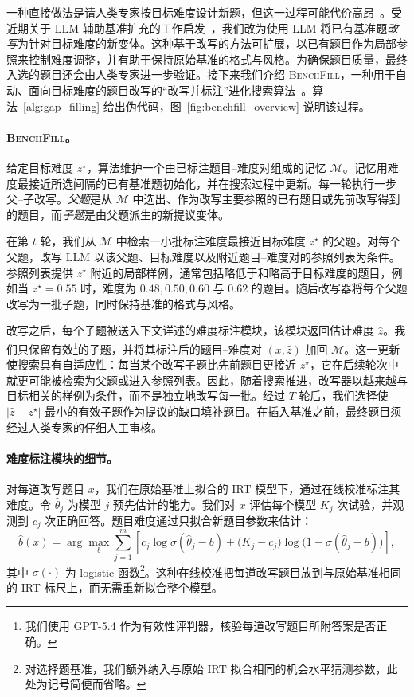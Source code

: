 一种直接做法是请人类专家按目标难度设计新题，但这一过程可能代价高昂~\cite{rein2024,phan2025humanity}。受近期关于 LLM 辅助基准扩充的工作启发~\cite{cheng2026vera,li2025ride,ying2024automating,xia2024top}，我们改为使用 LLM 将已有基准题\textit{改写}为针对目标难度的新变体。这种基于改写的方法可扩展，以已有题目作为局部参照来控制难度调整，并有助于保持原始基准的格式与风格。为确保题目质量，最终入选的题目还会由人类专家进一步验证。接下来我们介绍 \textsc{BenchFill}，一种用于自动、面向目标难度的题目改写的“改写并标注”进化搜索算法~\citep{sharma5openevolve,liu2026evox}。算法~\ref{alg:gap_filling} 给出伪代码，图~\ref{fig:benchfill_overview} 说明该过程。

\paragraph{\textsc{BenchFill}。}
给定目标难度 $z^\star$，算法维护一个由已标注题目--难度对组成的记忆 $\mathcal{M}$。记忆用难度最接近所选间隔的已有基准题初始化，并在搜索过程中更新。每一轮执行一步父--子改写。\emph{父题}是从 $\mathcal{M}$ 中选出、作为改写主要参照的已有题目或先前改写得到的题目，而\emph{子题}是由父题派生的新提议变体。


在第 $t$ 轮，我们从 $\mathcal{M}$ 中检索一小批标注难度最接近目标难度 $z^\star$ 的父题。对每个父题，改写 LLM 以该父题、目标难度以及附近题目--难度对的参照列表为条件。参照列表提供 $z^\star$ 附近的局部样例，通常包括略低于和略高于目标难度的题目，例如当 $z^\star=0.55$ 时，难度为 $0.48,0.50,0.60$ 与 $0.62$ 的题目。随后改写器将每个父题改写为一批子题，同时保持基准的格式与风格。


改写之后，每个子题被送入下文详述的难度标注模块，该模块返回估计难度 $\hat{z}$。我们只保留有效\footnote{我们使用 GPT-5.4 作为有效性评判器，核验每道改写题目所附答案是否正确。}的子题，并将其标注后的题目--难度对 $(x,\hat{z})$ 加回 $\mathcal{M}$。这一更新使搜索具有自适应性：每当某个改写子题比先前题目更接近 $z^\star$，它在后续轮次中就更可能被检索为父题或进入参照列表。因此，随着搜索推进，改写器以越来越与目标相关的样例为条件，而不是独立地改写每一批。经过 $T$ 轮后，我们选择使 $|\hat{z}-z^\star|$ 最小的有效子题作为提议的缺口填补题目。在插入基准之前，最终题目须经过人类专家的仔细人工审核。

\paragraph{难度标注模块的细节。}
对每道改写题目 $x$，我们在原始基准上拟合的 IRT 模型下，通过在线校准标注其难度。令 $\hat{\theta}_j$ 为模型 $j$ 预先估计的能力。我们对 $x$ 评估每个模型 $K_j$ 次试验，并观测到 $c_j$ 次正确回答。题目难度通过只拟合新题目参数来估计：
\[
\hat{b}(x)
=
\arg\max_b
\sum_{j=1}^{m}
\left[
c_j\log \sigma(\hat{\theta}_j-b)
+
\bigl(K_j-c_j\bigr)\log\bigl(1-\sigma(\hat{\theta}_j-b)\bigr)
\right],
\]
其中 $\sigma(\cdot)$ 为 logistic 函数\footnote{对选择题基准，我们额外纳入与原始 IRT 拟合相同的机会水平猜测参数，此处为记号简便而省略。}。这种在线校准把每道改写题目放到与原始基准相同的 IRT 标尺上，而无需重新拟合整个模型。




